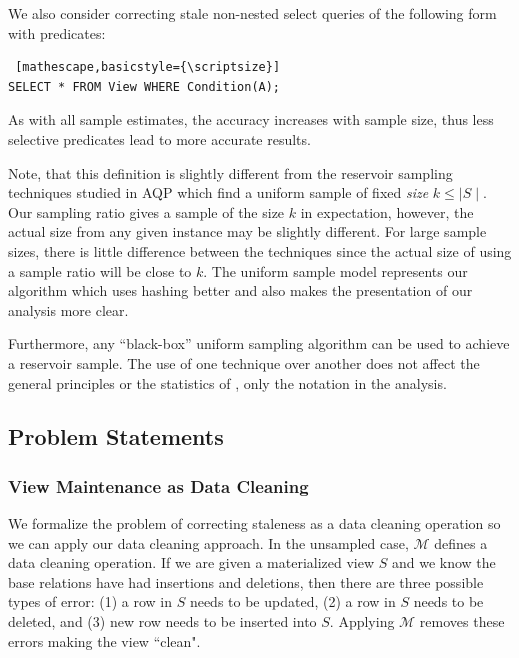 We also consider correcting stale non-nested select queries of the following form with predicates:
\begin{lstlisting} [mathescape,basicstyle={\scriptsize}]
SELECT * FROM View WHERE Condition(A);
\end{lstlisting}
As with all sample estimates, the accuracy increases with sample size, thus less selective predicates lead to more accurate results.




Note, that this definition is slightly different from the reservoir sampling techniques studied in AQP \cite{DBLP:journals/toms/Vitter85} which find a uniform sample of fixed \emph{size} $k\le \mid S \mid$.
Our sampling ratio gives a sample of the size $k$ in expectation, however, the actual size from any given instance may be slightly different.
For large sample sizes, there is little difference between the techniques since the actual size of using a sample ratio will be close to $k$.
The uniform sample model represents our algorithm which uses hashing better and also makes the presentation of our analysis more clear.

Furthermore, any ``black-box'' uniform sampling algorithm can be used to achieve a reservoir sample.
The use of one technique over another does not affect the general principles or the statistics of \svc, only the 
notation in the analysis.


\subsection{Problem Statements}
\subsubsection{View Maintenance as Data Cleaning}\label{cleaning}
We formalize the problem of correcting staleness as a data cleaning operation so we can apply our data cleaning approach.
In the unsampled case, $\mathcal{M}$ defines a data cleaning operation.
If we are given a materialized view $S$ and we know the base relations have had insertions and deletions, then there are three possible types of error:
(1) a row in $S$ needs to be updated, (2) a row in $S$ needs to be deleted, and (3) new row needs to be inserted into $S$.
Applying $\mathcal{M}$ removes these errors making the view ``clean".

